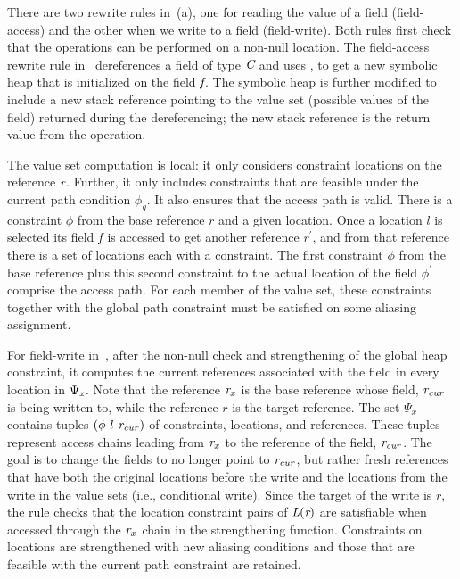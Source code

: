 There are two rewrite rules in~(a), one for reading
the value of a field (field-access) and the other when we write to a
field (field-write). Both rules first check that the operations can be
performed on a non-null location. The field-access rewrite rule
in~ dereferences a field of type $\emph{C}$ and
uses , to get a new symbolic heap that is
initialized on the field $\emph{f}$. The symbolic heap is further
modified to include a new stack reference pointing to the value set
(possible values of the field) returned during the dereferencing; the
new stack reference is the return value from the operation.


  

The value set computation is local: it only considers constraint
locations on the reference $\emph{r}$. Further, it only includes
constraints that are feasible under the current path condition
$\phi_g$. It also ensures that the access path is valid. There is a
constraint $\phi$ from the base reference $r$ and a given
location. Once a location $l$ is selected its field $\emph{f}$ is
accessed to get another reference $r^\prime$, and from that reference
there is a set of locations each with a constraint. The first
constraint $\phi$ from the base reference plus this second constraint
to the actual location of the field $\phi^\prime$ comprise the access
path. For each member of the value set, these constraints together
with the global path constraint must be satisfied on some aliasing
assignment. %


For field-write in~, after the non-null check and
strengthening of the global heap constraint, it computes the current
references associated with the field in every location in
$\Psi_{\emph{x}}$. Note that the reference $\emph{r}_x$ is the base
reference whose field, $\emph{r}_\mathit{cur}$ is being written to,
while the reference $r$ is the target reference. The set $\Psi_x$
contains tuples $(\phi\ l\ \cfgnt{r}_\mathit{cur})$ of constraints,
locations, and references. These tuples represent access chains
leading from $\emph{r}_x$ to the reference of the field,
$\emph{r}_\mathit{cur}$. The goal is to change the fields to no
longer point to $\emph{r}_\mathit{cur}$, but rather fresh references
that have both the original locations before the write and the
locations from the write in the value sets (i.e., conditional
write). Since the target of the write is $r$, the rule checks that the
location constraint pairs of $\emph{L}(\emph{r})$ are satisfiable
when accessed through the $\emph{r}_x$ chain in the strengthening
function.   Constraints on locations are strengthened
with new aliasing conditions and those that are feasible with the
current path constraint are retained.


